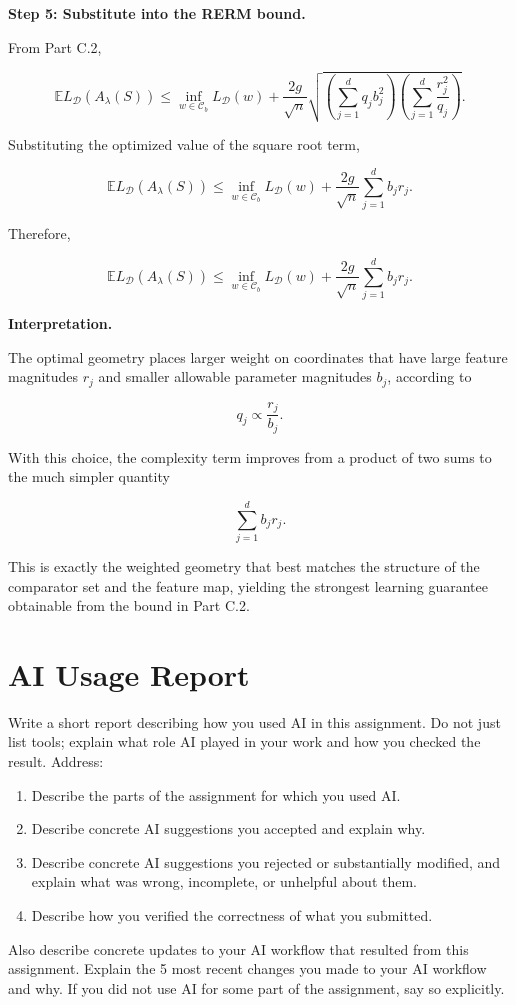 \documentclass[11pt]{article}
\newcommand{\E}{\mathbb{E}}
\begin{document}
\begin{enumerate}
\begin{solutionbox}
\textbf{Step 5: Substitute into the RERM bound.}

From Part C.2,

\[
\E L_{\mathcal D}(A_\lambda(S))
\le
\inf_{w\in\mathcal C_b}
L_{\mathcal D}(w)
+
\frac{2g}{\sqrt n}
\sqrt{
\left(
\sum_{j=1}^{d}
q_j b_j^2
\right)
\left(
\sum_{j=1}^{d}
\frac{r_j^2}{q_j}
\right)
}.
\]

Substituting the optimized value of the square root term,

\[
\E L_{\mathcal D}(A_\lambda(S))
\le
\inf_{w\in\mathcal C_b}
L_{\mathcal D}(w)
+
\frac{2g}{\sqrt n}
\sum_{j=1}^{d}
b_jr_j.
\]

Therefore,

\[
\boxed{
\E L_{\mathcal D}(A_\lambda(S))
\le
\inf_{w\in\mathcal C_b}
L_{\mathcal D}(w)
+
\frac{2g}{\sqrt n}
\sum_{j=1}^{d}
b_jr_j.
}
\]

\medskip

\textbf{Interpretation.}

The optimal geometry places larger weight on coordinates that have large feature magnitudes \(r_j\) and smaller allowable parameter magnitudes \(b_j\), according to

\[
q_j
\propto
\frac{r_j}{b_j}.
\]

With this choice, the complexity term improves from a product of two sums to the much simpler quantity

\[
\sum_{j=1}^{d}
b_jr_j.
\]

This is exactly the weighted geometry that best matches the structure of the comparator set and the feature map, yielding the strongest learning guarantee obtainable from the bound in Part C.2.

\end{solutionbox}

\end{enumerate}

\section{AI Usage Report}

Write a short report describing how you used AI in this assignment. Do not just list tools; explain what role AI played in your work and how you checked the result. Address:
\begin{enumerate}
    \item Describe the parts of the assignment for which you used AI.
    \item Describe concrete AI suggestions you accepted and explain why.
    \item Describe concrete AI suggestions you rejected or substantially modified, and explain what was wrong, incomplete, or unhelpful about them.
    \item Describe how you verified the correctness of what you submitted.
\end{enumerate}
Also describe concrete updates to your AI workflow that resulted from this assignment. Explain the 5 most recent changes you made to your AI workflow and why. If you did not use AI for some part of the assignment, say so explicitly.
\end{document}
